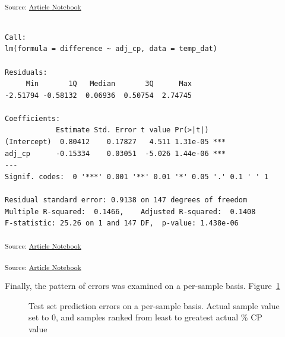 \documentclass[
]{agujournal2019}
\begin{document}
\textsubscript{Source:
\href{https://rvcrawford.github.io/glowing-system/index.qmd.html}{Article
Notebook}}

\begin{verbatim}

Call:
lm(formula = difference ~ adj_cp, data = temp_dat)

Residuals:
     Min       1Q   Median       3Q      Max 
-2.51794 -0.58132  0.06936  0.50754  2.74745 

Coefficients:
            Estimate Std. Error t value Pr(>|t|)    
(Intercept)  0.80412    0.17827   4.511 1.31e-05 ***
adj_cp      -0.15334    0.03051  -5.026 1.44e-06 ***
---
Signif. codes:  0 '***' 0.001 '**' 0.01 '*' 0.05 '.' 0.1 ' ' 1

Residual standard error: 0.9138 on 147 degrees of freedom
Multiple R-squared:  0.1466,    Adjusted R-squared:  0.1408 
F-statistic: 25.26 on 1 and 147 DF,  p-value: 1.438e-06
\end{verbatim}

\textsubscript{Source:
\href{https://rvcrawford.github.io/glowing-system/index.qmd.html}{Article
Notebook}}

\textsubscript{Source:
\href{https://rvcrawford.github.io/glowing-system/index.qmd.html}{Article
Notebook}}

Finally, the pattern of errors was examined on a per-sample basis.
Figure~\ref{fig-validation_set_performance}

\label{cell-fig-validation_set_performance}
\begin{figure}[H]


\caption{\label{fig-validation_set_performance}Test set prediction
errors on a per-sample basis. Actual sample value set to 0, and samples
ranked from least to greatest actual \% CP value}

\end{figure}%
\end{document}
